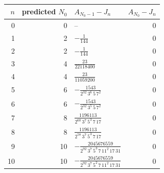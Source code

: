 \begin{tabular}{rrlr}
\toprule
$n$ & predicted $N_0$ & $A_{N_0-1}-J_n$ & $A_{N_0}-J_n$ \\
\midrule
0 & 0 & -- & $0$ \\
1 & 2 & $-\frac{1}{144}$ & $0$ \\
2 & 2 & $-\frac{1}{144}$ & $0$ \\
3 & 4 & $\frac{23}{22118400}$ & $0$ \\
4 & 4 & $\frac{23}{11059200}$ & $0$ \\
5 & 6 & $-\frac{1543}{2^{32}\,3^{6}\,5\,7^{2}}$ & $0$ \\
6 & 6 & $-\frac{1543}{2^{32}\,3^{5}\,5\,7^{2}}$ & $0$ \\
7 & 8 & $\frac{1196113}{2^{60}\,3^{7}\,5^{3}\,7\,17}$ & $0$ \\
8 & 8 & $\frac{1196113}{2^{58}\,3^{7}\,5^{3}\,7\,17}$ & $0$ \\
9 & 10 & $-\frac{2045676559}{2^{92}\,3^{7}\,5^{3}\,7\,11^{2}\,17\,31}$ & $0$ \\
10 & 10 & $-\frac{2045676559}{2^{92}\,3^{7}\,5^{2}\,7\,11^{2}\,17\,31}$ & $0$ \\
\bottomrule
\end{tabular}

